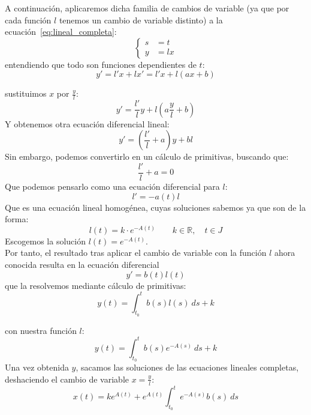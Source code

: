 A continuación, aplicaremos dicha familia de cambios de variable (ya que por cada función $l$ tenemos un cambio de variable distinto) a la ecuación~\ref{eq:lineal_completa}:
\begin{equation*}
    \left\{\begin{array}{rl}
            s &= t \\
            y &= lx
    \end{array}\right.
\end{equation*}
entendiendo que todo son funciones dependientes de $t$:
\begin{equation*}
    y' = l' x + lx' = l'x + l(ax+b)
\end{equation*}

sustituimos $x$ por $\frac{y}{l}$:
\begin{equation*}
    y' = \dfrac{l'}{l}y + l\left(a\dfrac{y}{l}+b\right)
\end{equation*}
Y obtenemos otra ecuación diferencial lineal:
\begin{equation*}
    y' = \left(\dfrac{l'}{l} + a\right) y + bl
\end{equation*}
Sin embargo, podemos convertirlo en un cálculo de primitivas, buscando que:
\begin{equation*}
    \dfrac{l'}{l}+a = 0
\end{equation*}
Que podemos pensarlo como una ecuación diferencial para $l$:
\begin{equation*}
    l' = -a(t) l
\end{equation*}
Que es una ecuación lineal homogénea, cuyas soluciones sabemos ya que son de la forma: 
\begin{equation*}
    l(t) = k\cdot e^{-A(t)} \qquad k\in \mathbb{R},\quad t\in J
\end{equation*}
Escogemos la solución $l(t) = e^{-A(t)}$.\\

Por tanto, el resultado tras aplicar el cambio de variable con la función $l$ ahora conocida resulta en la ecuación diferencial
\begin{equation*}
    y' = b(t)l(t)
\end{equation*}
que la resolvemos mediante cálculo de primitivas:
\begin{equation*}
    y(t) = \int_{t_0}^{t} b(s)l(s)~ds + k
\end{equation*}

con nuestra función $l$:
\begin{equation*}
    y(t) = \int_{t_0}^{t} b(s)e^{-A(s)}~ds + k
\end{equation*}
Una vez obtenida $y$, sacamos las soluciones de las ecuaciones lineales completas, deshaciendo el cambio de variable $x=\frac{y}{l}$:
\begin{equation*}
    x(t) = ke^{A(t)} + e^{A(t)} \int_{t_0}^{t} e^{-A(s)}b(s)~ds 
\end{equation*}

